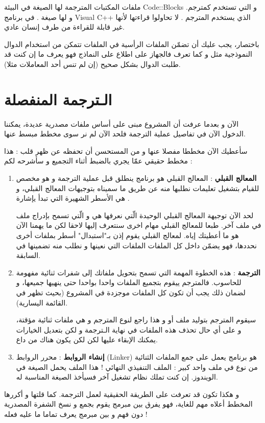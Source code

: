 
ملفات المكتبات المترجمة لها الصيغة
في البيئة
\textenglish{Code::Blocks}
و التي تستخدم
كمترجم. و لها صيغة
.
في برنامج
\textenglish{Visual C++}
الذي يستخدم المترجم
.
لا تحاولوا قراءتها لأنها غير قابلة للقراءة من طرف إنسان عادي.

باختصار، يجب عليك أن تضمّن الملفات الرأسية
في الملفات
تتمكن من استخدام الدوال النموذجية مثل
و كما تعرف فالجهاز على اطلاع على النماذج فهو يعرف ما إن كنت قد طلبت الدوال بشكل صحيح (إن لم تنس أحد المعاملات مثلا).

\section{الـترجمة المنفصلة}
الآن و بعدما عرفت أن المشروع مبنى على أساس ملفات مصدرية عديدة، يمكننا الدخول الآن في تفاصيل عملية الترجمة فلحد الآن لم نر سوى مخطط مبسط عنها.

سأعطيك الآن مخططا مفصلا عنها و من المستحسن أن تحفظه عن ظهر قلب :
هذا مخطط حقيقي عمّا يجري بالضبط أثناء التجميع و سأشرحه لكم :
\begin{enumerate}
  \item \textbf{المعالج القبلي} :
المعالج القبلي هو برنامج ينطلق قبل عملية الترجمة و هو مخصص للقيام بتشغيل تعليمات نطلبها منه عن طريق ما سميناه بتوجيهات المعالج القبلي، و هي الأسطر الشهيرة التي تبدأ يإشارة
\InlineCode{\#}.

لحد الآن توجيهة المعالج القبلي الوحيدة الّتي نعرفها هي
و الّتي تسمح بإدراج ملف في ملف آخر. طبعا للمعالج القبلي مهام اخرى سنتعرف إليها لاحقا لكن ما يهمنا الآن هو ما أعطيتك إياه.
لمعالج القبلي يقوم إذن بـ"استبدال" أسطر
بملفات أخرى نحددها، فهو يضمّن داخل كل الملفات
الملفات
التي نعينها و نطلب منه تضمينها في السابقة.
  \item \textbf{الترجمة} : هذه الخطوة المهمة التي تسمح بتحويل ملفاتك إلى شفرات ثنائية مفهومة للحاسوب. فالمترجم ييقوم بتجميع الملفات
واحدا بواحدا حتى ينهيها جميعها، و لضمان ذلك يجب أن تكون كل الملفات موجزدة في المشروع (بحيث تظهر في القائمة اليسارية).

سيقوم المترجم بتوليد ملف
أو
و هذا راجع لنوع المترجم و هي ملفات ثنائية مؤقتة، و على أي حال تحذف هذه الملفات في نهاية الـترجمة و لكن بتعديل الخيارات يمكنك الإبقاء عليها لكن لكن يكون هناك من داع.
  \item \textbf{إنشاء الروابط} :
محرر الروابط
(\textenglish{Linker})
هو برنامج يعمل على جمع الملفات الثنائية من نوع
في ملف واحد كبير : الملف التنفيذي النهائي ! هذا الملف يحمل الصيغة
في الويندوز. إن كنت تملك نظام تشغيل آخر فسيأخذ الصيغة المناسبة له.
\end{enumerate}
و هكذا تكون قد تعرفت على الطريقة الحقيقية لعمل الترجمة. كما قلتها و أكررها المخطط أعلاه مهم للغاية، فهو يفرق بين مبرمج يقوم بجمع و نسخ الشفرة المصدرية دون فهم و بين مبرمج يعرف تماما ما عليه فعله !

